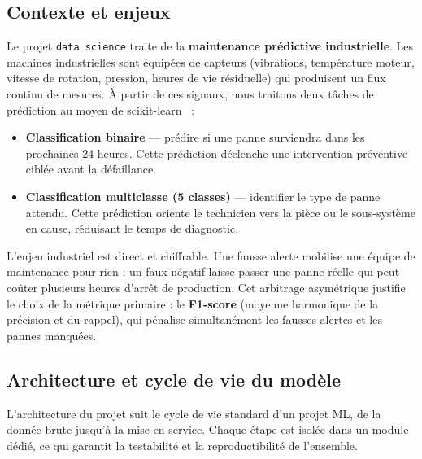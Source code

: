 \documentclass{article}
\begin{document}
\subsection{Contexte et enjeux}

Le projet \texttt{data science} traite de la \textbf{maintenance
    prédictive industrielle}. Les machines industrielles sont équipées de capteurs
(vibrations, température moteur, vitesse de rotation, pression, heures de vie
résiduelle) qui produisent un flux continu de mesures. À partir de ces signaux,
nous traitons deux tâches de prédiction au moyen de scikit-learn~\cite{sklearn} :

\begin{itemize}[leftmargin=1.4em, itemsep=2pt, topsep=3pt]
    \item \textbf{Classification binaire} --- prédire si une panne surviendra dans
          les prochaines 24 heures. Cette prédiction déclenche une intervention préventive
          ciblée avant la défaillance.
    \item \textbf{Classification multiclasse (5 classes)} --- identifier le type de
          panne attendu. Cette prédiction oriente le technicien vers la pièce ou le
          sous-système en cause, réduisant le temps de diagnostic.
\end{itemize}

L'enjeu industriel est direct et chiffrable. Une fausse alerte mobilise une équipe
de maintenance pour rien ; un faux négatif laisse passer une panne réelle qui peut
coûter plusieurs heures d'arrêt de production. Cet arbitrage asymétrique justifie
le choix de la métrique primaire : le \textbf{F1-score} (moyenne harmonique de la
précision et du rappel), qui pénalise simultanément les fausses alertes et les
pannes manquées.

\subsection{Architecture et cycle de vie du modèle}

L'architecture du projet suit le cycle de vie standard d'un projet ML, de la donnée
brute jusqu'à la mise en service. Chaque étape est isolée dans un module dédié, ce
qui garantit la testabilité et la reproductibilité de l'ensemble.
\end{document}

